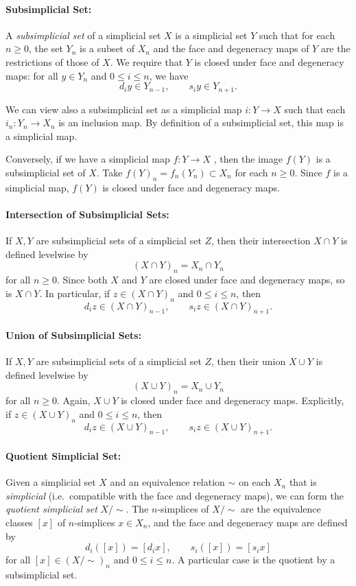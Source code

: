 \documentclass[11pt]{article}
\theoremstyle{definition}
\theoremstyle{plain}
\begin{document}
\paragraph{\textbf{Subsimplicial Set:}}
A \emph{subsimplicial set} of a simplicial set $X$ is a simplicial set $Y$ such that for each $n \geq 0$, the set $Y_n$ is a subset of $X_n$ and the face and degeneracy maps of $Y$ are the restrictions of those of $X$.
We require that $Y$ is closed under face and degeneracy maps: for all $y \in Y_n$ and $0 \leq i \leq n$, we have
\[
    d_i y \in Y_{n-1}, \qquad s_i y \in Y_{n+1}.
\]

We can view also a subsimplicial set as a simplicial map $i : Y \to X$ such that each $i_n : Y_n \to X_n$ is an inclusion map. By definition of a subsimplicial set, this map is a simplicial map.

Conversely, if we have a simplicial map $f : Y \to X$ , then the image $f(Y)$ is a subsimplicial set of $X$. Take $f(Y)_n = f_n(Y_n) \subset X_n$ for each $n \geq 0$. Since $f$ is a simplicial map, $f(Y)$ is closed under face and degeneracy maps.

\paragraph{\textbf{Intersection of Subsimplicial Sets:}}
If $X ,Y $ are subsimplicial sets of a simplicial set $Z$, then their intersection $X \cap Y$ is defined levelwise by
\[
    (X \cap Y)_n = X_n \cap Y_n
\]
for all $n \geq 0$. Since both $X$ and $Y$ are closed under face and degeneracy maps, so is $X \cap Y$. In particular, if $z \in (X \cap Y)_n$ and $0 \leq i \leq n$, then
\[
    d_i z \in (X \cap Y)_{n-1}, \qquad s_i z \in (X \cap Y)_{n+1}.
\]

\paragraph{\textbf{Union of Subsimplicial Sets:}}
If $X ,Y $ are subsimplicial sets of a simplicial set $Z$, then their union $X \cup Y$ is defined levelwise by
\[
    (X \cup Y)_n = X_n \cup Y_n
\]
for all $n \geq 0$. Again, $X \cup Y$ is closed under face and degeneracy maps. Explicitly, if $z \in (X \cup Y)_n$ and $0 \leq i \leq n$, then
\[
    d_i z \in (X \cup Y)_{n-1}, \qquad s_i z \in (X \cup Y)_{n+1}.
\]

\paragraph{\textbf{Quotient Simplicial Set:}}
Given a simplicial set $X$ and an equivalence relation $\sim$ on each $X_n$ that is \emph{simplicial} (i.e.~compatible with the face and degeneracy maps), we can form the \emph{quotient simplicial set} $X/\sim$. The $n$-simplices of $X/\sim$ are the equivalence classes $[x]$ of $n$-simplices $x \in X_n$, and the face and degeneracy maps are defined by
\[
    d_i([x]) = [d_i x], \qquad s_i([x]) = [s_i x]
\]
for all $[x] \in (X/\sim)_n$ and $0 \leq i \leq n$.
A particular case is the quotient by a subsimplicial set.
\end{document}
